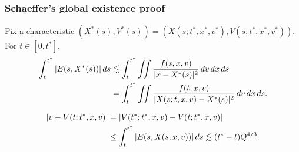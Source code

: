 \documentclass[11pt]{article}
\begin{document}
\subsubsection{Schaeffer's global existence proof}

Fix a characteristic $(X^*(s),V^*(s))=(X(s;t^*,x^*,v^*),V(s;t^*,x^*,v^*))$.
For $t\in[0,t^*]$,
\begin{align*}
\int_t^{t^*}|E(s,X^*(s))|\,ds
&\lesssim\int_t^{t^*}\iint\frac{f(s,x,v)}{|x-X^*(s)|^2}\,dv\,dx\,ds\\
&=\int_t^{t^*}\iint\frac{f(t,x,v)}{|X(s;t,x,v)-X^*(s)|^2}\,dv\,dx\,ds.
\end{align*}

\begin{align*}
|v-V(t;t^*,x,v)|
&=|V(t^*;t^*,x,v)-V(t;t^*,x,v)|\\
&\le\int_t^{t^*}|E(s,X(s,x,v))|\,ds
\lesssim(t^*-t)Q^{4/3}.
\end{align*}
\end{document}
